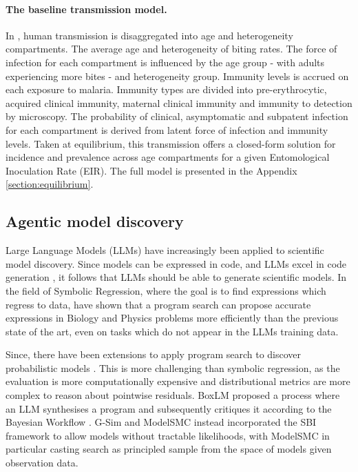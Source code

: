 \documentclass[11pt]{article}
\begin{document}
\paragraph{The baseline transmission model.} In \citet{griffin_estimates_2014}, human transmission is disaggregated into age and heterogeneity compartments. The average age and heterogeneity of biting rates. The force of infection for each compartment is influenced by the age group - with adults experiencing more bites - and heterogeneity group. Immunity levels is accrued on each exposure to malaria. Immunity types are divided into pre-erythrocytic, acquired clinical immunity, maternal clinical immunity and immunity to detection by microscopy. The probability of clinical, asymptomatic and subpatent infection for each compartment is derived from latent force of infection and immunity levels. Taken at equilibrium, this transmission offers a closed-form solution for incidence and prevalence across age compartments for a given Entomological Inoculation Rate (EIR). The full model is presented in the Appendix \ref{section:equilibrium}.

\subsection{Agentic model discovery}

Large Language Models (LLMs) have increasingly been applied to scientific model discovery. Since models can be expressed in code, and LLMs excel in code generation \citep{Jimenez2023Oct}, it follows that LLMs should be able to generate scientific models. In the field of Symbolic Regression, where the goal is to find expressions which regress to data, \citet{Shojaee2024Apr} have shown that a program search can propose accurate expressions in Biology and Physics problems more efficiently than the previous state of the art, even on tasks which do not appear in the LLMs training data.

Since, there have been extensions to apply program search to discover probabilistic models \citep{Li2024Feb,Gelman2020Nov,Holt2025Jun,Wahl2026Feb}. This is more challenging than symbolic regression, as the evaluation is more computationally expensive and distributional metrics are more complex to reason about pointwise residuals. BoxLM \citep{Li2024Feb} proposed a process where an LLM synthesises a program and subsequently critiques it according to the Bayesian Workflow \citep{Gelman2020Nov}. G-Sim \citep{Holt2025Jun} and ModelSMC \cite{Wahl2026Feb} instead incorporated the SBI framework to allow models without tractable likelihoods, with ModelSMC in particular casting search as principled sample from the space of models given observation data.
\end{document}
